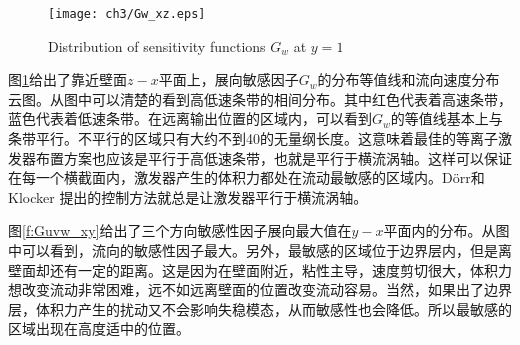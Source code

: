 \begin{figure}[htb]
  \centering
  \texttt{[image: ch3/Gw\_xz.eps]}\\
  \caption{Distribution of sensitivity functions $G_w$ at $y=1$}\label{f:Gw_xz}
\end{figure}

图\ref{f:Gw_xz}给出了靠近壁面$z-x$平面上，展向敏感因子$G_w$的分布等值线和流向速度分布云图。从图中可以清楚的看到高低速条带的相间分布。其中红色代表着高速条带，蓝色代表着低速条带。在远离输出位置的区域内，可以看到$G_w$的等值线基本上与条带平行。不平行的区域只有大约不到40的无量纲长度。这意味着最佳的等离子激发器布置方案也应该是平行于高低速条带，也就是平行于横流涡轴。这样可以保证在每一个横截面内，激发器产生的体积力都处在流动最敏感的区域内。D\"orr和Klocker \cite{dorr2015stabilisation,dorr2016}提出的控制方法就总是让激发器平行于横流涡轴。

图\ref{f:Guvw_xy}给出了三个方向敏感性因子展向最大值在$y-x$平面内的分布。从图中可以看到，流向的敏感性因子最大。另外，最敏感的区域位于边界层内，但是离壁面却还有一定的距离。这是因为在壁面附近，粘性主导，速度剪切很大，体积力想改变流动非常困难，远不如远离壁面的位置改变流动容易。当然，如果出了边界层，体积力产生的扰动又不会影响失稳模态，从而敏感性也会降低。所以最敏感的区域出现在高度适中的位置。

